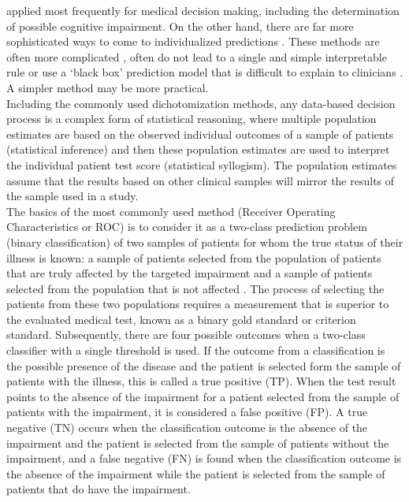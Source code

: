 \documentclass[
  nojss]{jss}
\begin{document}
applied most frequently for medical decision making, including the
determination of possible cognitive impairment. On the other hand, there
are far more sophisticated ways to come to individualized predictions
\citep{sheiner_bayesian_1982}. These methods are often more complicated
\citep{cripps_bayesian_2016}, often do not lead to a single and simple
interpretable rule \citep{logan_decision_2019} or use a `black box'
prediction model that is difficult to explain to clinicians
\citep{logan_decision_2019}. A simpler method may be more practical.\\
Including the commonly used dichotomization methods, any data-based
decision process is a complex form of statistical reasoning, where
multiple population estimates are based on the observed individual
outcomes of a sample of patients (statistical inference) and then these
population estimates are used to interpret the individual patient test
score (statistical syllogism). The population estimates assume that the
results based on other clinical samples will mirror the results of the
sample used in a study.\\
The basics of the most commonly used method (Receiver Operating
Characteristics or ROC) is to consider it as a two-class prediction
problem (binary classification) of two samples of patients for whom the
true status of their illness is known: a sample of patients selected
from the population of patients that are truly affected by the targeted
impairment and a sample of patients selected from the population that is
not affected \citep{pepe_statistical_2003}. The process of selecting the
patients from these two populations requires a measurement that is
superior to the evaluated medical test, known as a binary gold standard
or criterion standard. Subsequently, there are four possible outcomes
when a two-class classifier with a single threshold is used. If the
outcome from a classification is the possible presence of the disease
and the patient is selected form the sample of patients with the
illness, this is called a true positive (TP). When the test result
points to the absence of the impairment for a patient selected from the
sample of patients with the impairment, it is considered a false
positive (FP). A true negative (TN) occurs when the classification
outcome is the absence of the impairment and the patient is selected
from the sample of patients without the impairment, and a false negative
(FN) is found when the classification outcome is the absence of the
impairment while the patient is selected from the sample of patients
that do have the impairment.\\
\end{document}
